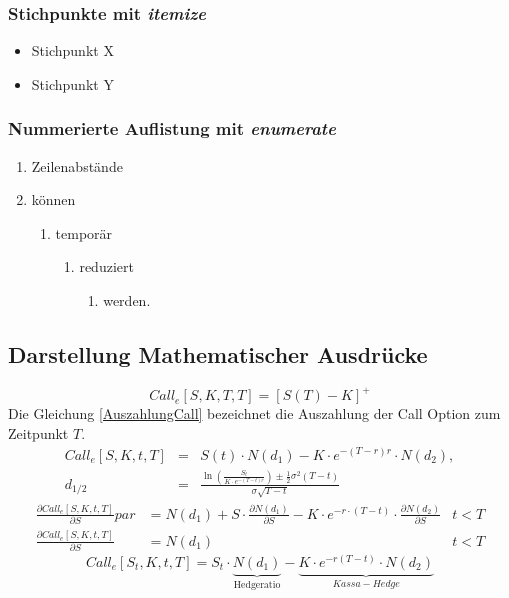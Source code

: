 \documentclass[12pt,a4paper]{article}
\begin{document}
\subsubsection{Stichpunkte mit \textbf{\emph{itemize}}}
{


\begin{itemize}%
\item Stichpunkt X
\item Stichpunkt Y
\end{itemize}
\subsubsection{Nummerierte Auflistung mit \textbf{\emph{enumerate}}}
\begin{enumerate}
    \item Zeilenabstände
    \item können
    \begin{enumerate}
        \item temporär
        \begin{enumerate}
            \item reduziert
            \begin{enumerate}
                \item werden.
            \end{enumerate}
        \end{enumerate}
    \end{enumerate}
\end{enumerate}
}
\newpage %

\subsection{Darstellung Mathematischer Ausdrücke}\label{math}
\begin{equation}\label{AuszahlungCall}
Call_e[S,K,T,T]=\left[S(T)-K\right]^+
\end{equation}
Die Gleichung \eqref{AuszahlungCall} bezeichnet die Auszahlung der Call Option zum Zeitpunkt $T$.
\begin{eqnarray*}
Call_e[S,K,t,T]&=&S(t)\cdot N(d_1)-K\cdot e^{-(T-r)r}\cdot N(d_2),\\
d_{1/2}&=&\frac{\ln\left(\frac{S_t}{K\cdot e^{-(T-t)r}}\right)\pm\frac{1}{2}\sigma^2(T-t)}{\sigma\sqrt{T-t}}
\end{eqnarray*}
\begin{align}
\frac{\partial Call_e[S,K,t,T]}{\partial S}par&=N(d_1)+S\cdot\frac{\partial N(d_1)}{\partial S}-K\cdot e^{-r\cdot(T-t)}\cdot\frac{\partial N(d_2)}{\partial S}&t<T\\
\frac{\partial Call_e[S,K,t,T]}{\partial S}&=N(d_1)&t<T
\end{align}
$$Call_e[S_t,K,t,T]=S_t\cdot \underbrace{N(d_1)}_{\text{Hedgeratio}}-\underbrace{K\cdot e^{-r(T-t)}\cdot N(d_2)}_{Kassa-Hedge}$$
\end{document}
